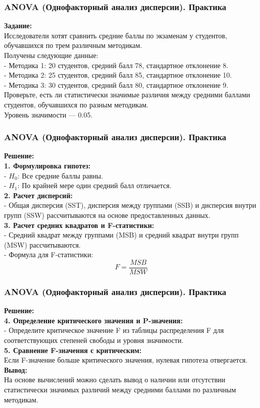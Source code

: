 \documentclass[aspectratio=169]{beamer}
\begin{document}
\begin{frame}
\frametitle{ANOVA (Однофакторный анализ дисперсии). Практика}
{\bf Задание:}\\
Исследователи хотят сравнить средние баллы по экзаменам у студентов, обучавшихся по трем различным методикам.\\
Получены следующие данные:\\
- Методика 1: 20 студентов, средний балл 78, стандартное отклонение 8.\\
- Методика 2: 25 студентов, средний балл 85, стандартное отклонение 10.\\
- Методика 3: 30 студентов, средний балл 80, стандартное отклонение 9.\\
Проверьте, есть ли статистически значимые различия между средними баллами студентов, обучавшихся по разным методикам.\\
Уровень значимости — 0.05.
\end{frame}

\begin{frame}
\frametitle{ANOVA (Однофакторный анализ дисперсии). Практика}
{\bf Решение:}\\
{\bf 1. Формулировка гипотез:}\\
- $H_0$: Все средние баллы равны.\\
- $H_1$: По крайней мере один средний балл отличается.\\
{\bf 2. Расчет дисперсий:}\\
- Общая дисперсия (SST), дисперсия между группами (SSB) и дисперсия внутри групп (SSW) рассчитываются на основе предоставленных данных.\\
{\bf 3. Расчет средних квадратов и F-статистики:}\\
- Средний квадрат между группами (MSB) и средний квадрат внутри групп (MSW) рассчитываются.\\
- Формула для F-статистики:
     \[
     F = \frac{MSB}{MSW}
     \]
\end{frame}

\begin{frame}
\frametitle{ANOVA (Однофакторный анализ дисперсии). Практика}
{\bf Решение:}\\
{\bf 4. Определение критического значения и P-значения:}\\
- Определите критическое значение F из таблицы распределения F для соответствующих степеней свободы и уровня значимости.\\
{\bf 5. Сравнение F-значения с критическим:}\\
Если F-значение больше критического значения, нулевая гипотеза отвергается.
\newline\\
{\bf Вывод:}\\
На основе вычислений можно сделать вывод о наличии или отсутствии статистически значимых различий между средними баллами по различным методикам.
\end{frame}
\end{document}
